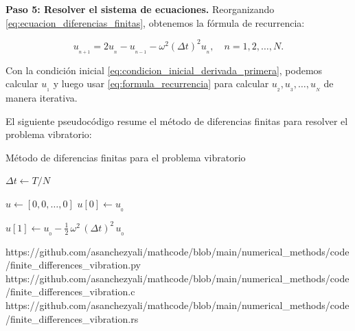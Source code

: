 \textbf{Paso 5: Resolver el sistema de ecuaciones.} Reorganizando \eqref{eq:ecuacion_diferencias_finitas}, obtenemos la
fórmula de recurrencia:

\begin{equation}
    u_{_{n+1}} = 2u_{_n} - u_{_{n-1}} - \omega^2 (\Delta t)^2 u_{_n}, \quad n = 1, 2, \ldots, N.
    \label{eq:formula_recurrencia}
\end{equation}

Con la condición inicial \eqref{eq:condicion_inicial_derivada_primera}, podemos calcular $u_{_1}$ y luego usar
\eqref{eq:formula_recurrencia} para calcular $u_{_2}, u_{_3}, \ldots, u_{_N}$ de manera iterativa.

El siguiente pseudocódigo resume el método de diferencias finitas para resolver el problema vibratorio:

\begin{algorithmbox}{Método de diferencias finitas para el problema vibratorio}
    \label{alg:diferencias_finitas_vibratorio}
    \begin{minipage}[t]{\dimexpr\linewidth-2cm\relax}
    \begin{algorithm}[H]
        \DontPrintSemicolon
        \SetAlgoVlined
        \BlankLine

        $\Delta t \leftarrow T / N$\;
        \BlankLine

        $u \leftarrow [0, 0, \ldots, 0]$\;
        $u[0] \leftarrow u_{_0}$\;
        \BlankLine

        $u[1] \leftarrow u_{_0} - \tfrac{1}{2}\,\omega^2\,(\Delta t)^2\,u_{_0}$\;
        \BlankLine

        \BlankLine

        \;
    \end{algorithm}
    \end{minipage}%
    \hfill
    \codeqrsidebar
        {https://github.com/asanchezyali/mathcode/blob/main/numerical_methods/code/finite_differences_vibration.py}
        {https://github.com/asanchezyali/mathcode/blob/main/numerical_methods/code/finite_differences_vibration.c}
        {https://github.com/asanchezyali/mathcode/blob/main/numerical_methods/code/finite_differences_vibration.rs}
\end{algorithmbox}